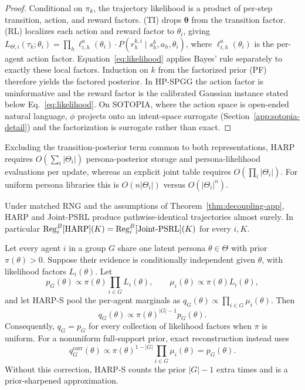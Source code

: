 \begin{proof}[Proof]
Conditional on $\pi_k$, the trajectory likelihood is a product of per-step transition, action, and reward factors. (TI) drops $\boldsymbol\theta$ from the transition factor. (RL) localizes each action and reward factor to $\theta_i$, giving $L_{\Theta,i}(\tau_k;\theta_i) = \prod_h \ell^{a}_{i,h}(\theta_i) \cdot P(r_h^{k,i}\!\mid\! s_h^k,a_h,\theta_i)$, where $\ell^{a}_{i,h}(\theta_i)$ is the per-agent action factor. Equation~\eqref{eq:likelihood} applies Bayes' rule separately to exactly these local factors. Induction on $k$ from the factorized prior (PF) therefore yields the factored posterior. In HP-SPGG the action factor is uninformative and the reward factor is the calibrated Gaussian instance stated below Eq.~\eqref{eq:likelihood}. On SOTOPIA, where the action space is open-ended natural language, $\phi$ projects onto an intent-space surrogate (Section~\ref{app:sotopia-detail}) and the factorization is surrogate rather than exact.
\end{proof}

\begin{corollary}\label{cor:storage} Excluding the transition-posterior term common to both representations, HARP requires $O(\sum_i|\Theta_i|)$ persona-posterior storage and persona-likelihood evaluations per update, whereas an explicit joint table requires $O(\prod_i|\Theta_i|)$. For uniform persona libraries this is $O(n|\Theta_i|)$ versus $O(|\Theta_i|^n)$. \end{corollary}

\begin{proposition}\label{prop:bit-identical} Under matched RNG and the assumptions of Theorem~\ref{thm:decoupling-app}, HARP and Joint-PSRL produce pathwise-identical trajectories almost surely. In particular $\mathrm{Reg}_i^B[\textnormal{HARP}](K) = \mathrm{Reg}_i^B[\textnormal{Joint-PSRL}](K)$ for every $i, K$. \end{proposition}

\begin{proposition}
\label{prop:uniform-group-pooling}
Let every agent $i$ in a group $G$ share one latent persona $\theta\in\Theta$ with prior $\pi(\theta)>0$. Suppose their evidence is conditionally independent given $\theta$, with likelihood factors $L_i(\theta)$. Let
\[
p_G(\theta)\propto \pi(\theta)\prod_{i\in G}L_i(\theta),
\qquad
\mu_i(\theta)\propto \pi(\theta)L_i(\theta),
\]
and let HARP-S pool the per-agent marginals as $q_G(\theta)\propto\prod_{i\in G}\mu_i(\theta)$. Then
\[
q_G(\theta)\propto \pi(\theta)^{|G|-1}p_G(\theta).
\]
Consequently, $q_G=p_G$ for every collection of likelihood factors when $\pi$ is uniform. For a nonuniform full-support prior, exact reconstruction instead uses
\[
q_G^{\mathrm{corr}}(\theta)\propto
\pi(\theta)^{1-|G|}\prod_{i\in G}\mu_i(\theta)=p_G(\theta).
\]
Without this correction, HARP-S counts the prior $|G|-1$ extra times and is a prior-sharpened approximation.
\end{proposition}

